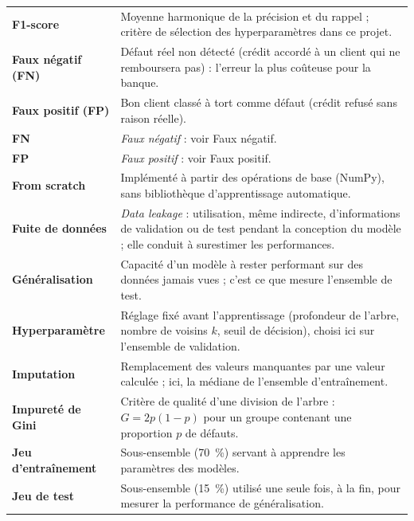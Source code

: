 \begin{longtable}{@{}>{\raggedright\bfseries}p{3.2cm}@{\hspace{0.4cm}}>{\raggedright\arraybackslash}p{\dimexpr\textwidth-3.7cm\relax}@{}}
F1-score & Moyenne harmonique de la précision et du rappel ; critère de
  sélection des hyperparamètres dans ce projet. \\

Faux négatif (FN) & Défaut réel non détecté (crédit accordé à un client qui ne
  remboursera pas) : l'erreur la plus coûteuse pour la banque. \\

Faux positif (FP) & Bon client classé à tort comme défaut (crédit refusé sans
  raison réelle). \\

FN & \emph{Faux négatif} : voir Faux négatif. \\

FP & \emph{Faux positif} : voir Faux positif. \\

From scratch & Implémenté à partir des opérations de base (NumPy), sans
  bibliothèque d'apprentissage automatique. \\

Fuite de données & \emph{Data leakage} : utilisation, même indirecte,
  d'informations de validation ou de test pendant la conception du modèle ;
  elle conduit à surestimer les performances. \\

Généralisation & Capacité d'un modèle à rester performant sur des données jamais
  vues ; c'est ce que mesure l'ensemble de test. \\

Hyperparamètre & Réglage fixé avant l'apprentissage (profondeur de l'arbre,
  nombre de voisins $k$, seuil de décision), choisi ici sur l'ensemble de
  validation. \\

Imputation & Remplacement des valeurs manquantes par une valeur calculée ; ici,
  la médiane de l'ensemble d'entraînement. \\

Impureté de Gini & Critère de qualité d'une division de l'arbre : $G = 2p(1-p)$
  pour un groupe contenant une proportion $p$ de défauts. \\

Jeu d'entraînement & Sous-ensemble (70~\%) servant à apprendre les paramètres
  des modèles. \\

Jeu de test & Sous-ensemble (15~\%) utilisé une seule fois, à la fin, pour
  mesurer la performance de généralisation. \\


\end{longtable}
